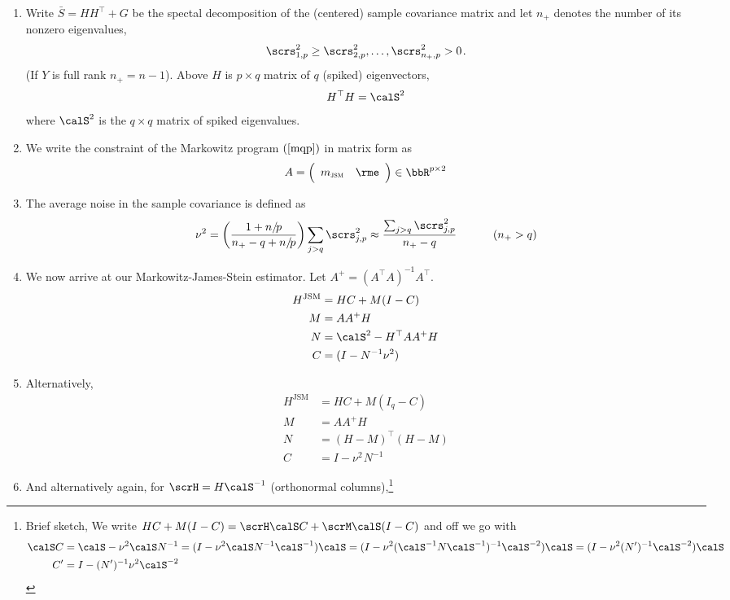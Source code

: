 \documentclass[12pt, leqno, letterpaper]{article}
\newcommand{\s}[1][1]{\hspace{#1pt}}
\newcommand{\np}{n/\s[-1.5] p}
\newcommand{\qeig}{\calS}
\newcommand{\seig}{\scrs}
\newcommand{\Id}{I}
\newcommand{\req}[1]{(\ref{#1})}
\begin{document}
\begin{enumerate}
\item Write $\bar{S} = HH^\top + G$ be the spectal decomposition 
of the (centered) sample covariance matrix
and let $n_+$ denotes the number of its nonzero eigenvalues,
\[ \seig_{1,p}^2 \ge \seig_{2,p}^2, \dots, \seig^2_{n_+,p} > 0 \s . \]
(If $Y$ is full rank $n_+ = n -1$).
Above $H$ is $p \times q$ matrix of $q$ (spiked) eigenvectors,
\[  H^\top H = \qeig^2 \]
where $\qeig^2$ is the $q \times q$ matrix of spiked
eigenvalues.
\item We write the constraint of the Markowitz program
$\req{mqp}$ in matrix form as
\begin{align} \label{mqp}
 A = \Big(
\begin{array}{cc} m_\js & \rme \end{array}
\Big) \in \bbR^{p \times 2}
\end{align}
\item The average noise in the sample covariance is defined as
\[
 \nu^2 = 
\bigg( \frac{1 + \np}{n_+ - q + \np} \bigg)
\sum_{j > q} \scrs^2_{j,p} \approx
\frac{\sum_{j > q} \scrs^2_{j,p}}{n_+ -q}
\s[32] (n_+ > q) \]
\item We now arrive at our Markowitz-James-Stein estimator.
Let $A^+ = (A^\top A)^{-1} A^\top$.
\begin{align*}
  H^{\text{JSM}} &=  H  C + M  (\Id - C)  \\
 M &=  A A^+ H \\
 N &=   \qeig^2- H^\top AA^+ H \\
C &= (\Id -  N^{-1} \nu^2 )
\end{align*}
\item Alternatively, \begin{align*}
  H^{\text{JSM}} &= H C + M (\Id_q - C) \\
 M &=  A A^+ H \\
 N &= (H- M)^\top (H-M) \\
 C &= \Id - \nu^2 \s N^{-1} 
\end{align*}
\item And alternatively again, for $\scrH = H \calS^{-1}$
(orthonormal columns),\footnote{Brief sketch, We write
$HC + M(\Id - C) = \scrH \qeig  C
+ \scrM \qeig (\Id - C)$ and off we go with
\begin{align*}
\qeig C &= \qeig - \nu^2 \qeig N^{-1} 
= (\Id - \nu^2 \qeig N^{-1} \qeig^{-1}) \qeig 
= (\Id - \nu^2 (\qeig^{-1} N \qeig^{-1})^{-1} \qeig^{-2}) \qeig
= (\Id - \nu^2( N')^{-1} \qeig^{-2}) \qeig  \\
C' &= \Id - (N')^{-1} \nu^2 \qeig^{-2}   \\

\end{align*}}
\end{enumerate}
\end{document}
